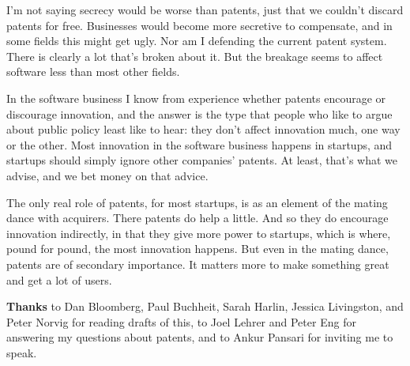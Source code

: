 I'm not saying secrecy would be worse than patents, just that we
couldn't discard patents for free. Businesses would become more
secretive to compensate, and in some fields this might get ugly. Nor am
I defending the current patent system. There is clearly a lot that's
broken about it. But the breakage seems to affect software less than
most other fields.

In the software business I know from experience whether patents
encourage or discourage innovation, and the answer is the type that
people who like to argue about public policy least like to hear: they
don't affect innovation much, one way or the other. Most innovation in
the software business happens in startups, and startups should simply
ignore other companies' patents. At least, that's what we advise, and we
bet money on that advice.

The only real role of patents, for most startups, is as an element of
the mating dance with acquirers. There patents do help a little. And so
they do encourage innovation indirectly, in that they give more power to
startups, which is where, pound for pound, the most innovation happens.
But even in the mating dance, patents are of secondary importance. It
matters more to make something great and get a lot of users.


\textbf{Thanks} to Dan Bloomberg, Paul Buchheit, Sarah Harlin, Jessica
Livingston, and Peter Norvig for reading drafts of this, to Joel Lehrer
and Peter Eng for answering my questions about patents, and to Ankur
Pansari for inviting me to speak.